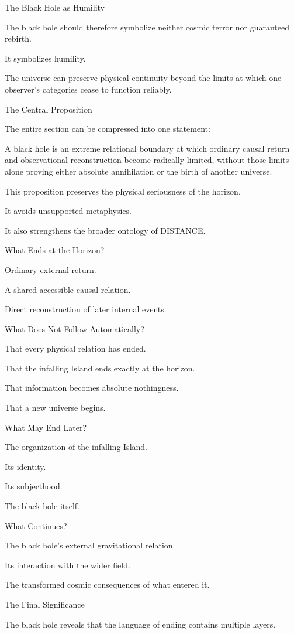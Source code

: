 The Black Hole as Humility

The black hole should therefore symbolize neither cosmic terror nor guaranteed rebirth.

It symbolizes humility.

The universe can preserve physical continuity beyond the limits at which one observer’s categories cease to function reliably.

The Central Proposition

The entire section can be compressed into one statement:

A black hole is an extreme relational boundary at which ordinary causal return and observational reconstruction become radically limited, without those limits alone proving either absolute annihilation or the birth of another universe.

This proposition preserves the physical seriousness of the horizon.

It avoids unsupported metaphysics.

It also strengthens the broader ontology of DISTANCE.

What Ends at the Horizon?

Ordinary external return.

A shared accessible causal relation.

Direct reconstruction of later internal events.

What Does Not Follow Automatically?

That every physical relation has ended.

That the infalling Island ends exactly at the horizon.

That information becomes absolute nothingness.

That a new universe begins.

What May End Later?

The organization of the infalling Island.

Its identity.

Its subjecthood.

The black hole itself.

What Continues?

The black hole’s external gravitational relation.

Its interaction with the wider field.

The transformed cosmic consequences of what entered it.

The Final Significance

The black hole reveals that the language of ending contains multiple layers.

